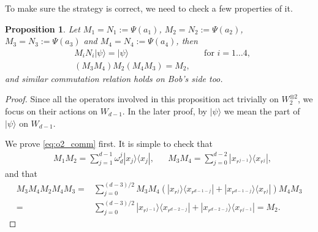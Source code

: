 \documentclass[11pt,letterpaper]{article}
\newcommand{\ket}[1]{|#1\rangle}
\newcommand{\ketbra}[2]{|#1\rangle\langle#2|}
\newcommand{\x}{\otimes}
\newcommand{\1}{\mathbb{1}}
\newtheorem{proposition}[theorem]{Proposition}
\theoremstyle{definition}
\begin{document}
To make sure the strategy is correct, we need to check a few properties of it.
\begin{proposition}
Let $M_1 = N_1 :=\Psi(a_1)$, $M_2 = N_2 := \Psi(a_2)$, $M_3 = N_3 := \Psi(a_3)$
and $M_4 = N_4 := \Psi(a_4)$, then
\begin{align}
	\label{eq:mn_preserve} &M_i N_i \ket{\psi} = \ket{\psi} && \text{for } i = 1 \dots 4,\\
	\label{eq:o2_comm} &(M_3M_4)M_2(M_4M_3) = M_2,
\end{align}
and similar commutation relation holds on Bob's side too.
\end{proposition}
\begin{proof}
	Since all the operators involved in this proposition act trivially on $W_2^{\x 2}$, we focus on
	their actions on $W_{d-1}$. In the later proof, by $\ket{\psi}$ we mean the part of $\ket{\psi}$ on $W_{d-1}$.
	
	We prove \cref{eq:o2_comm} first. It is simple to check that
	\begin{align*}
		&M_1M_2= \sum_{j=1}^{d-1} \omega_d^{j} \ketbra{x_j}{x_j},
		&&M_3M_4= \sum_{j=0}^{d-2} \ketbra{x_{r^{j-1}}}{x_{r^j}},
	\end{align*}
	and that 
	\begin{align*}
		M_3M_4 M_2 M_4 M_3 = &\sum_{j=0}^{(d-3)/2} M_3M_4 (\ketbra{x_{r^j}}{x_{r^{d-1-j}}}+\ketbra{x_{r^{d-1-j}}}{x_{r^j}}) M_4M_3\\
		=& \sum_{j=0}^{(d-3)/2} \ketbra{x_{r^{j-1}}}{x_{r^{d-2-j}}}+\ketbra{x_{r^{d-2-j}}}{x_{r^{j-1}}} = M_2.
	\end{align*}
	

\end{proof}
\end{document}
